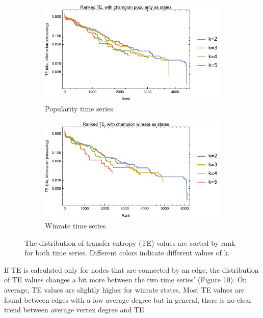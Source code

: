 \documentclass[twoside]{article}
\begin{document}
\begin{multicols}{2}
\begin{figure}
\centering
\begin{subfigure}{.5\textwidth}
  \centering
  \includegraphics[width=1\linewidth]{popularity_TE_prelim.pdf}
  \caption{Popularity time series}
  \label{fig:sub1}
\end{subfigure}%
\begin{subfigure}{.5\textwidth}
  \centering
  \includegraphics[width=1\linewidth]{winrate_TE_prelim.pdf}
  \caption{Winrate time series}
  \label{fig:sub2}
\end{subfigure}
\caption{The distribution of transfer entropy (TE) values are sorted by rank for both time series. Different colors indicate different values of k.}
\label{fig:test}
\end{figure}

If TE is calculated only for nodes that are connected by an edge, the distribution of TE values changes a bit more between the two time series' (Figure 10). On average, TE values are slightly higher for winrate states. Most TE values are found between edges with a low average degree but in general, there is no clear trend between average vertex degree and TE. 


\end{multicols}
\end{document}
